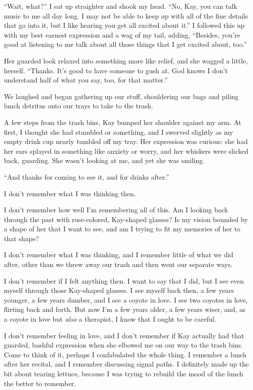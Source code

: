 ``Wait, what?'' I sat up straighter and shook my head. ``No, Kay, you can talk music to me all day long. I may not be able to keep up with all of the fine details that go into it, but I like hearing you get all excited about it.'' I followed this up with my best earnest expression and a wag of my tail, adding, ``Besides, you're good at listening to me talk about all those things that I get excited about, too.''

Her guarded look relaxed into something more like relief, and she wagged a little, herself. ``Thanks. It's good to have someone to gush at. God knows I don't understand half of what you say, too, for that matter.''

We laughed and began gathering up our stuff, shouldering our bags and piling lunch detritus onto our trays to take to the trash.

A few steps from the trash bins, Kay bumped her shoulder against my arm. At first, I thought she had stumbled or something, and I swerved slightly as my empty drink cup nearly tumbled off my tray. Her expression was curious: she had her ears splayed in something like anxiety or worry, and her whiskers were slicked back, guarding. She wasn't looking at me, and yet she was smiling.

``And thanks for coming to see it, and for drinks after.''

I don't remember what I was thinking then.

I don't remember how well I'm remembering all of this. Am I looking back through the past with rose-colored, Kay-shaped glasses? Is my vision bounded by a shape of her that I want to see, and am I trying to fit my memories of her to that shape?

I don't remember what I was thinking, and I remember little of what we did after, other than we threw away our trash and then went our separate ways.

I don't remember if I felt anything then. I want to say that I did, but I see even myself through those Kay-shaped glasses. I see myself back then, a few years younger, a few years dumber, and I see a coyote in love. I see two coyotes in love, flirting back and forth. But now I'm a few years older, a few years wiser, and, as a coyote in love but \emph{also} a therapist, I know that I ought to be careful.

I don't remember feeling in love, and I don't remember if Kay actually had that guarded, bashful expression when she elbowed me on our way to the trash bins. Come to think of it, perhaps I confabulated the whole thing. I remember a lunch after her recital, and I remember discussing signal paths. I definitely made up the bit about tearing lettuce, because I was trying to rebuild the mood of the lunch the better to remember.


